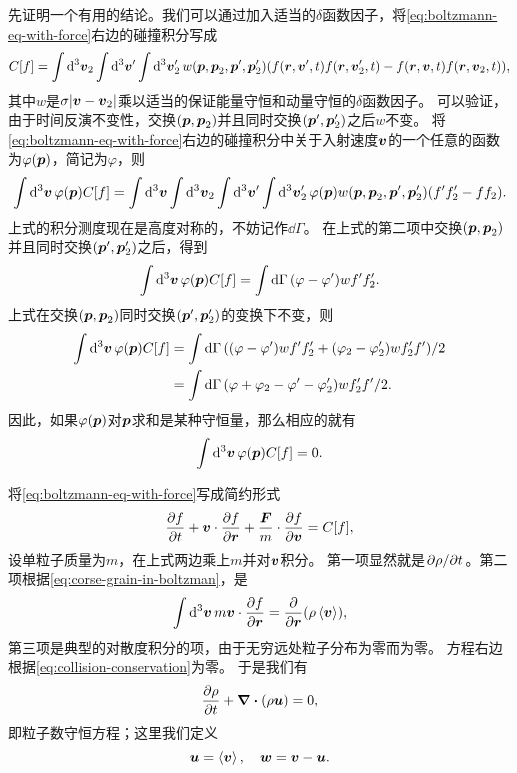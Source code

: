先证明一个有用的结论。我们可以通过加入适当的$\delta$函数因子，将\eqref{eq:boltzmann-eq-with-force}右边的碰撞积分写成
\begin{equation}
    C[f] = \int \dd[3]{\vb*{v}_2} \int \dd[3]{\vb*{v}'} \int \dd[3]{\vb*{v}_2'} w(\vb*{p}, \vb*{p}_2, \vb*{p}', \vb*{p}_2') (f(\vb*{r}, \vb*{v}', t) f(\vb*{r}, \vb*{v}'_{2}, t) - f(\vb*{r}, \vb*{v}, t) f(\vb*{r}, \vb*{v}_{2}, t)),
\end{equation}
其中$w$是$\sigma \abs{\vb*{v} - \vb*{v}_2}$乘以适当的保证能量守恒和动量守恒的$\delta$函数因子。
可以验证，由于时间反演不变性，交换$(\vb*{p}, \vb*{p}_2)$并且同时交换$(\vb*{p}', \vb*{p}_2')$之后$w$不变。
将\eqref{eq:boltzmann-eq-with-force}右边的碰撞积分中关于入射速度$\vb*{v}$的一个任意的函数为$\varphi(\vb*{p})$，简记为$\varphi$，则
\[
    \int \dd[3]{\vb*{v}} \varphi(\vb*{p}) C[f] = \int \dd[3]{\vb*{v}} \int \dd[3]{\vb*{v}_2} \int \dd[3]{\vb*{v}'} \int \dd[3]{\vb*{v}_2'} \varphi(\vb*{p}) w(\vb*{p}, \vb*{p}_2, \vb*{p}', \vb*{p}_2') (f' f_2' - f f_2).
\]
上式的积分测度现在是高度对称的，不妨记作$\dd{\Gamma}$。
在上式的第二项中交换$(\vb*{p}, \vb*{p}_2)$并且同时交换$(\vb*{p}', \vb*{p}_2')$之后，得到
\[
    \int \dd[3]{\vb*{v}} \varphi(\vb*{p}) C[f] = \int \dd{\Gamma} (\varphi - \varphi') w f' f_2'.
\]
上式在交换$(\vb*{p}, \vb*{p}_2)$同时交换$(\vb*{p}', \vb*{p}_2')$的变换下不变，则
\[
    \begin{aligned}
        \int \dd[3]{\vb*{v}} \varphi(\vb*{p}) C[f] &= \int \dd{\Gamma} ((\varphi - \varphi') w f' f_2' + (\varphi_2 - \varphi_2') w f'_2 f') / 2 \\
        &= \int \dd{\Gamma} (\varphi + \varphi_2 - \varphi' - \varphi'_2) w f'_2 f' / 2.
    \end{aligned}
\]
因此，如果$\varphi(\vb*{p})$对$\vb*{p}$求和是某种守恒量，那么相应的就有
\begin{equation}
    \int \dd[3]{\vb*{v}} \varphi(\vb*{p}) C[f] = 0.
    \label{eq:collision-conservation}
\end{equation}

将\eqref{eq:boltzmann-eq-with-force}写成简约形式
\begin{equation}
    \pdv{f}{t} + \vb*{v} \cdot \pdv{f}{\vb*{r}} + \frac{\vb*{F}}{m} \cdot \pdv{f}{\vb*{v}} = C[f],
    \label{eq:boltmann-eq-simple-form}
\end{equation}
设单粒子质量为$m$，在上式两边乘上$m$并对$\vb*{v}$积分。
第一项显然就是$\pdv*{\rho}{t}$。第二项根据\eqref{eq:corse-grain-in-boltzman}，是
\[
    \int \dd[3]{\vb*{v}} m \vb*{v} \cdot \pdv{f}{\vb*{r}} = \pdv{\vb*{r}} (\rho \expval{\vb*{v}}),
\]
第三项是典型的对散度积分的项，由于无穷远处粒子分布为零而为零。
方程右边根据\eqref{eq:collision-conservation}为零。
于是我们有
\begin{equation}
    \pdv{\rho}{t} + \div{(\rho \vb*{u})} = 0,
    \label{eq:ns-particle}
\end{equation}
即粒子数守恒方程；这里我们定义
\begin{equation}
    \vb*{u} = \expval{\vb*{v}}, \quad \vb*{w} = \vb*{v} - \vb*{u}.
    \label{eq:v-decomposite-u-w}
\end{equation}

